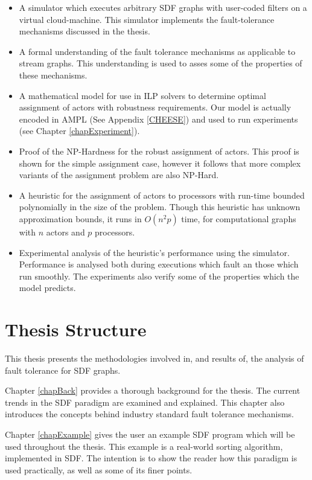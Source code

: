 \begin{itemize}
	\item A simulator which executes arbitrary SDF graphs with user-coded filters on a virtual cloud-machine.
			This simulator implements the fault-tolerance mechanisms discussed in the thesis.
	\item A formal understanding of the fault tolerance mechanisms as applicable to stream graphs.
			This understanding is used to asses some of the properties of these mechanisms.
	\item A mathematical model for use in ILP solvers to determine optimal assignment of actors with robustness requirements.
			Our model is actually encoded in AMPL (See Appendix \ref{CHEESE}) and used to run experiments (see Chapter \ref{chapExperiment}).
	\item Proof of the NP-Hardness for the robust assignment of actors.
			This proof is shown for the simple assignment case, however it follows that more complex variants of the assignment problem are also NP-Hard.
	\item A heuristic for the assignment of actors to processors with run-time bounded polynomially in the size of the problem.
			Though this heuristic has unknown approximation bounds, it runs in $O(n^2 p)$ time, for computational graphs with $n$ actors and $p$ processors.
	\item Experimental analysis of the heuristic's performance using the simulator.
			Performance is analysed both during executions which fault an those which run smoothly.
			The experiments also verify some of the properties which the model predicts.
\end{itemize}

\section{Thesis Structure}

This thesis presents the methodologies involved in, and results of, the analysis of fault tolerance for SDF graphs.

Chapter \ref{chapBack} provides a thorough background for the thesis.
The current trends in the SDF paradigm are examined and explained.
This chapter also introduces the concepts behind industry standard fault tolerance mechanisms.

Chapter \ref{chapExample} gives the user an example SDF program which will be used throughout the thesis.
This example is a real-world sorting algorithm, implemented in SDF.
The intention is to show the reader how this paradigm is used practically, as well as some of its finer points.

